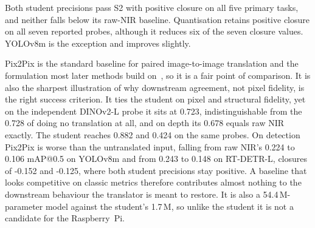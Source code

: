 \begin{table}[!htbp]
\centering
\footnotesize
{}
\caption{Headline gap-closure summary for the selected student before and after mixed-INT8 export. Positive closure means the translated output is closer to native-RGB model behaviour than raw NIR. For the lower-is-better depth metric, the closure sign is inverted by the harness. }
\label{tab:res_gapclosure}
\end{table}

Both student precisions pass S2 with positive closure on all five primary tasks, and neither falls below its raw-NIR baseline. Quantisation retains positive closure on all seven reported probes, although it reduces six of the seven closure values. YOLOv8m is the exception and improves slightly.

Pix2Pix is the standard baseline for paired image-to-image translation and the formulation most later methods build on~\cite{isola2017image,wang2018pix2pixhd,park2019spade,pix2next2024}, so it is a fair point of comparison. It is also the sharpest illustration of why downstream agreement, not pixel fidelity, is the right success criterion. It ties the student on pixel and structural fidelity, yet on the independent DINOv2-L probe it sits at 0.723, indistinguishable from the 0.728 of doing no translation at all, and on depth its 0.678 equals raw NIR exactly. The student reaches 0.882 and 0.424 on the same probes. On detection Pix2Pix is worse than the untranslated input, falling from raw NIR's 0.224 to 0.106 mAP@0.5 on YOLOv8m and from 0.243 to 0.148 on RT-DETR-L, closures of -0.152 and -0.125, where both student precisions stay positive. A baseline that looks competitive on classic metrics therefore contributes almost nothing to the downstream behaviour the translator is meant to restore. It is also a 54.4\,M-parameter model against the student's 1.7\,M, so unlike the student it is not a candidate for the Raspberry~Pi.

